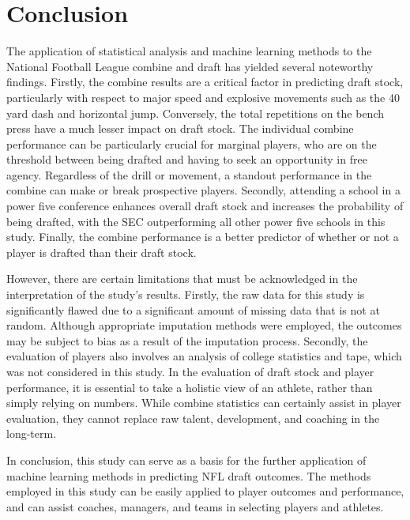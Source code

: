 \documentclass[12pt,english]{article}
\begin{document}
\section{Conclusion}\label{sec:conclusion}
The application of statistical analysis and machine learning methods to the National Football League combine and draft has yielded several noteworthy findings. Firstly, the combine results are a critical factor in predicting draft stock, particularly with respect to major speed and explosive movements such as the 40 yard dash and horizontal jump. Conversely, the total repetitions on the bench press have a much lesser impact on draft stock. The individual combine performance can be particularly crucial for marginal players, who are on the threshold between being drafted and having to seek an opportunity in free agency. Regardless of the drill or movement, a standout performance in the combine can make or break prospective players. Secondly, attending a school in a power five conference enhances overall draft stock and increases the probability of being drafted, with the SEC outperforming all other power five schools in this study. Finally, the combine performance is a better predictor of whether or not a player is drafted than their draft stock.

However, there are certain limitations that must be acknowledged in the interpretation of the study's results. Firstly, the raw data for this study is significantly flawed due to a significant amount of missing data that is not at random. Although appropriate imputation methods were employed, the outcomes may be subject to bias as a result of the imputation process. Secondly, the evaluation of players also involves an analysis of college statistics and tape, which was not considered in this study. In the evaluation of draft stock and player performance, it is essential to take a holistic view of an athlete, rather than simply relying on numbers. While combine statistics can certainly assist in player evaluation, they cannot replace raw talent, development, and coaching in the long-term.

In conclusion, this study can serve as a basis for the further application of machine learning methods in predicting NFL draft outcomes. The methods employed in this study can be easily applied to player outcomes and performance, and can assist coaches, managers, and teams in selecting players and athletes.

\vfill
\pagebreak{}
\begin{spacing}{1.0}


\end{spacing}
\end{document}
